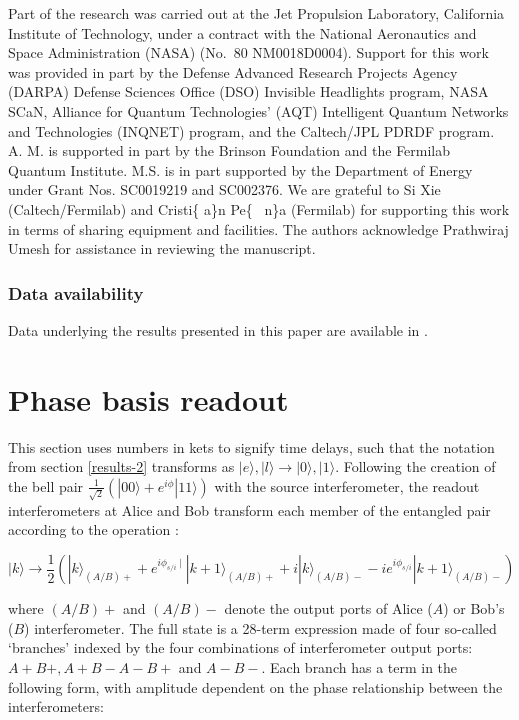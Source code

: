 \documentclass[11pt]{caltech_thesis} %
\begin{document}
Part of the research was carried out at the Jet Propulsion Laboratory, California Institute of Technology, under a contract with the National Aeronautics and Space Administration (NASA) (No.~80 NM0018D0004). Support for this work was provided in part by the Defense Advanced Research Projects Agency (DARPA) Defense Sciences Office (DSO) Invisible Headlights program, NASA SCaN, Alliance for Quantum Technologies' (AQT) Intelligent Quantum Networks and Technologies (INQNET) program, and the Caltech/JPL PDRDF program. A. M. is supported in part by the Brinson Foundation and the Fermilab Quantum Institute. M.S. is in part supported by the Department of Energy under Grant Nos. SC0019219 and SC002376. We are grateful to Si Xie (Caltech/Fermilab) and Cristi\{\textquotesingle{} a\}n Pe\{~ n\}a (Fermilab) for supporting this work in terms of sharing equipment and facilities. The authors acknowledge Prathwiraj Umesh for assistance in reviewing the manuscript.

\hypertarget{data-availability}{%
\subsubsection{Data availability}\label{data-availability}}

Data underlying the results presented in this paper are available in \autocite{mueller2023code,mueller2023data}.

\hypertarget{phase-basis-readout}{%
\section{Phase basis readout}\label{phase-basis-readout}}

This section uses numbers in kets to signify time delays, such that the notation from section \ref{results-2} transforms as $|e\rangle, |l\rangle \longrightarrow |0\rangle, |1\rangle$. Following the creation of the bell pair $\frac{1}{\sqrt{2}}(|00\rangle + e^{i \phi}|11\rangle)$ with the source interferometer, the readout interferometers at Alice and Bob transform each member of the entangled pair according to the operation \autocite{Marcikic2002}:

$$|k\rangle \rightarrow \frac{1}{2}\left(|k\rangle_{(A/B)+}+e^{i \phi_{s / i} \mid}|k+1\rangle_{(A/B)+}+i|k\rangle_{(A/B)-}-i e^{i \phi_{s / i}}|k+1\rangle_{(A/B)-}\right)$$

where $(A/B)+$ and $(A/B)-$ denote the output ports of Alice ($A$) or Bob's ($B$) interferometer. The full state is a 28-term expression made of four so-called `branches' indexed by the four combinations of interferometer output ports: $A+ B+, A+ B- A- B+$ and $A- B-$. Each branch has a term in the following form, with amplitude dependent on the phase relationship between the interferometers:
\end{document}
